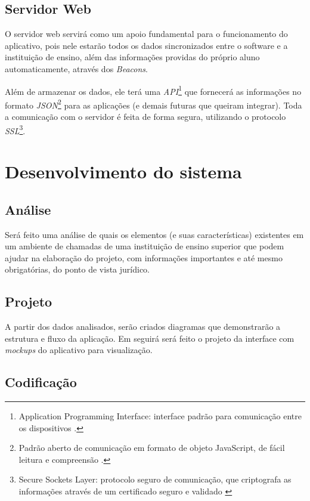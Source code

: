 \documentclass[
	12pt,
	oneside,
	a4paper,
	english,
	brazil,
]{abntex2}
\begin{document}
\subsection{Servidor Web}

O servidor web servirá como um apoio fundamental para o funcionamento do aplicativo, pois nele estarão todos os dados sincronizados entre o software e a instituição de ensino, além das informações providas do próprio aluno automaticamente, através dos \emph{Beacons}.

Além de armazenar os dados, ele terá uma \emph{API}\footnote{Application Programming Interface: interface padrão para comunicação entre os dispositivos \cite{footnote-api}.} que fornecerá as informações no formato \emph{JSON}\footnote{Padrão aberto de comunicação em formato de objeto JavaScript, de fácil leitura e compreensão \cite{footnote-json}.} para as aplicações (e demais futuras que queiram integrar). Toda a comunicação com o servidor é feita de forma segura, utilizando o protocolo \emph{SSL}\footnote{Secure Sockets Layer: protocolo seguro de comunicação, que criptografa as informações através de um certificado seguro e validado \cite{footnote-ssl}}. 

\section{Desenvolvimento do sistema}
\subsection{Análise}

Será feito uma análise de quais os elementos (e suas características) existentes em um ambiente de chamadas de uma instituição de ensino superior que podem ajudar na elaboração do projeto, com informações importantes e até mesmo obrigatórias, do ponto de vista jurídico.

\subsection{Projeto}

A partir dos dados analisados, serão criados diagramas que demonstrarão a estrutura e fluxo da aplicação. Em seguirá será feito o projeto da interface com \emph{mockups} do aplicativo para visualização.

\subsection{Codificação}
\end{document}
